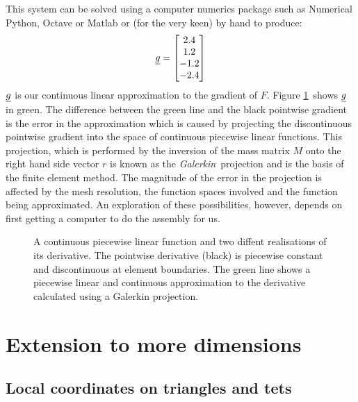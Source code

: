 \documentclass[a4paper, 11pt]{book}
\newcommand{\ifhtlatex}[2]{\ifthenelse{\boolean{HTLatex}}{#1}{#2}}
\newcommand{\xfig}[1]{
  \ifhtlatex{
    \texttt{[image: \#1.png]}
  }{
    
  }
}
\begin{document}
This system can be solved using a computer numerics package such as
Numerical Python, Octave or Matlab or (for the very keen) by hand to
produce:
\begin{equation}
  \underline{g}=
  \begin{bmatrix}
    2.4\\
    1.2\\
    -1.2\\
    -2.4
  \end{bmatrix}
\end{equation}
$\underline{g}$ is our continuous linear approximation to the gradient of $F$.
Figure \ref{fig:1dpointdfdxgalerkin}\ shows $\underline{g}$ in green. The
difference between the green line and the black pointwise gradient is the
error in the approximation which is caused by projecting the discontinuous
pointwise gradient into the space of continuous piecewise linear functions.
This projection, which is performed by the inversion of the mass matrix $M$
onto the right hand side vector $r$ is known as the \emph{Galerkin}\
projection and is the basis of the finite element method. The magnitude of
the error in the projection is affected by the mesh resolution, the function
spaces involved and the function being approximated. An exploration of these
possibilities, however, depends on first getting a computer to do the
assembly for us.
\begin{figure}[t]
  \centering
  \xfig{linear_1d_galerkin}
  \caption{A continuous piecewise linear function and two diffent
    realisations of its derivative. The pointwise 
    derivative (black) is piecewise constant and discontinuous at element
    boundaries. The green line shows a piecewise linear and continuous
    approximation to the derivative calculated using a Galerkin projection.}
  \label{fig:1dpointdfdxgalerkin}
\end{figure}

\chapter{Extension to more dimensions}

\section{Local coordinates on triangles and tets}
\end{document}
